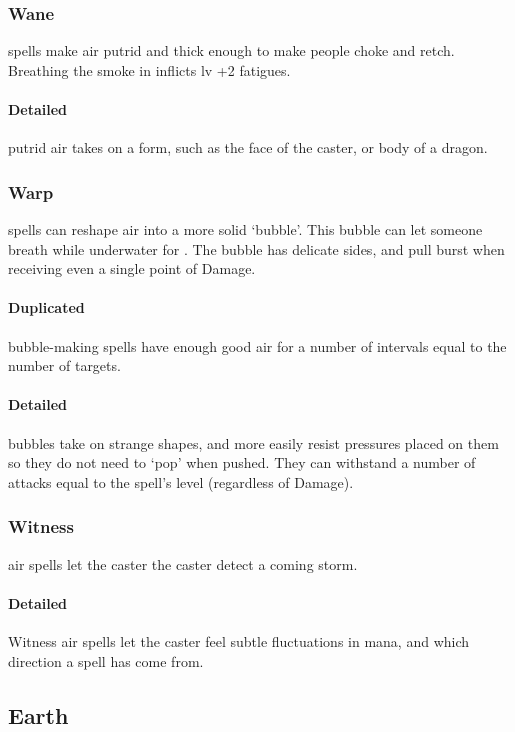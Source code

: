 \begin{multicols}{2}
\subsubsection{Wane}
spells make air putrid and thick enough to make people choke and retch.
Breathing the smoke in inflicts \gls{lv} +2 \glspl{fatigue}.

\paragraph{Detailed}
putrid air takes on a form, such as the face of the caster, or body of a dragon.

\subsubsection{Warp}
spells can reshape air into a more solid `bubble'.
This bubble can let someone breath while underwater for .
The bubble has delicate sides, and pull burst when receiving even a single point of Damage.

\paragraph{Duplicated}
bubble-making spells have enough good air for a number of \glspl{interval} equal to the number of targets.

\paragraph{Detailed}
bubbles take on strange shapes, and more easily resist pressures placed on them so they do not need to `pop' when pushed.
They can withstand a number of attacks equal to the spell's level (regardless of Damage).

\subsubsection{Witness}
air spells let the caster the caster detect a coming storm.

\paragraph{Detailed}
Witness air spells let the caster feel subtle fluctuations in mana, and which direction a spell has come from.

\subsection{Earth}

\end{multicols}
